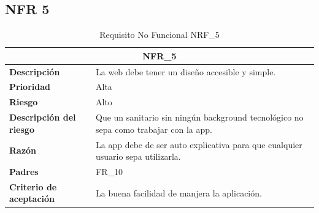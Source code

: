 \documentclass{scrreprt}
\begin{document}
\subsection{NFR 5}
\begin{table}[H]
    \label{tab:my-table}
    \begin{tabular}{|p{5cm}|p{11cm}|}
    \hline
    \multicolumn{2}{|c|}{\textbf{NFR_5}} \\
    \hline
    \textbf{Descripción  }                      &  La web debe tener un diseño accesible y simple.                                                                            \\ \hline
    \textbf{Prioridad}                          & Alta                                                                                              \\ \hline
    \textbf{Riesgo}                          & Alto                                                                                                \\ \hline
    \textbf{Descripción del riesgo}                    & Que un sanitario sin ningún background tecnológico no sepa como trabajar con la app.                                                                               \\ \hline
    \textbf{Razón}                   & La app debe de ser auto explicativa para que cualquier usuario sepa utilizarla.       \\ \hline
    \textbf{Padres}                               &  FR_10\\  \hline
     \textbf{Criterio de aceptación}                    & La buena facilidad de manjera la aplicación.  \\ \hline
    \end{tabular}%
    
    \caption{Requisito No Funcional NRF_5}
\end{table}
\end{document}
